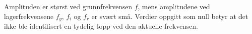 \begin{table}[h]
\centering
{}
\caption{Amplitude $A$ (mm/s) ved grunnfrekvens og lagerfrekvenser}
\label{tab:amplituder}
\end{table}

Amplituden er størst ved grunnfrekvensen $f$, mens amplitudene ved lagerfrekvensene $f_y$, $f_i$ og $f_r$ er svært små. Verdier oppgitt som null betyr at det ikke ble identifisert en tydelig topp ved den aktuelle frekvensen.
